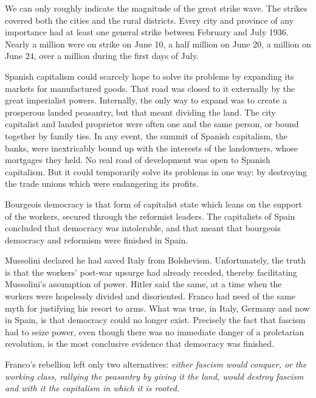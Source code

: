 We can only roughly indicate the magnitude of the great strike wave. The strikes covered both the cities and the rural districts. Every city and province of any importance had at least one general strike between February and July 1936. Nearly a million were on strike on June 10, a half million on June 20, a million on June 24, over a million during the first days of July.

Spanish capitalism could scarcely hope to solve its problems by expanding its markets for manufactured goods. That road was closed to it externally by the great imperialist powers. Internally, the only way to expand was to create a prosperous landed peasantry, but that meant dividing the land. The city capitalist and landed proprietor were often one and the same person, or bound together by family ties. In any event, the summit of Spanish capitalism, the banks, were inextricably bound up with the interests of the landowners, whose mortgages they held. No real road of development was open to Spanish capitalism. But it could temporarily solve its problems in one way: by destroying the trade unions which were endangering its profits.

Bourgeois democracy is that form of capitalist state which leans on the support of the workers, secured through the reformist leaders. The capitalists of Spain concluded that democracy was intolerable, and that meant that bourgeois democracy and reformism were finished in Spain.

Mussolini declared he had saved Italy from Bolshevism. Unfortunately, the truth is that the workers’ post-war upsurge had already receded, thereby facilitating Mussolini’s assumption of power. Hitler said the same, at a time when the workers were hopelessly divided and disoriented. Franco had need of the same myth for justifying his resort to arms. What was true, in Italy, Germany and now in Spain, is that democracy could no longer exist. Precisely the fact that fascism had to seize power, even though there was no immediate danger of a proletarian revolution, is the most conclusive evidence that democracy was finished.

Franco’s rebellion left only two alternatives: \emph{either fascism would conquer, or the working class, rallying the peasantry by giving it the land, would destroy fascism and with it the capitalism in which it is rooted.}

